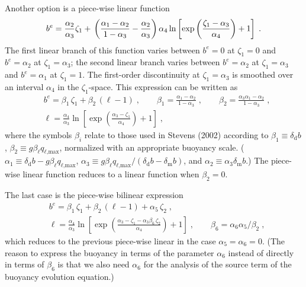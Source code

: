 Another option is a piece-wise linear function
\begin{equation}
b^e=\frac{\alpha_2}{\alpha_3}\zeta_1+\\
\left(\frac{\alpha_1-\alpha_2}{1-\alpha_3}-\frac{\alpha_2}{\alpha_3}\right)
\alpha_4\ln\left[\exp\left(\frac{\zeta_1-\alpha_3}{\alpha_4}\right)+1\right] \;.
\end{equation}
The first linear branch of this function varies between $b^e=0$ at $\zeta_1=0$
and $b^e=\alpha_2$ at $\zeta_1=\alpha_3$; the second linear branch varies
between $b^e=\alpha_2$ at $\zeta_1=\alpha_3$ and $b^e=\alpha_1$ at
$\zeta_1=1$. The first-order discontinuity at $\zeta_1=\alpha_3$ is smoothed
over an interval $\alpha_4$ in the $\zeta_1$-space. This expression can be
written as
\begin{equation}
\begin{aligned}
&b^e=\beta_1\,\zeta_1+\beta_2\,(\ell-1)\;,
\qquad \beta_1=\frac{\alpha_1-\alpha_2}{1-\alpha_3}\;,\qquad
\beta_2=\frac{\alpha_3\alpha_1-\alpha_2}{1-\alpha_3}\;,
\\
&\ell=\frac{\alpha_4}{\alpha_3}\ln\left[\exp\left(\frac{\alpha_3-\zeta_1}{\alpha_4}\right)+1\right] \;,
\end{aligned}
\end{equation}
where the symbols $\beta_i$ relate to those used in Stevens (2002) according to $\beta_1\equiv\delta_\text{d}b$, $\beta_2\equiv g\beta_\ell q_{\ell\text{,max}}$, normalized with an appropriate buoyancy scale. ($\alpha_1\equiv\delta_\text{d}b-g\beta_\ell q_{\ell\text{,max}}$, $\alpha_3\equiv g\beta_\ell q_{\ell\text{,max}}/(\delta_\text{d}b-\delta_\text{m}b)$, and $\alpha_2\equiv\alpha_3\delta_\text{m}b$.) The piece-wise linear function reduces to a linear function when $\beta_2=0$.

The last case is the piece-wise bilinear expression
\begin{equation}
\begin{aligned}
&b^e=\beta_1\,\zeta_1+\beta_2\,(\ell-1) + \alpha_5\,\zeta_2\;,\\
&\ell=\frac{\alpha_4}{\alpha_3}\ln\left[\exp\left(\frac{\alpha_3-\zeta_1-\alpha_3\beta_6\,\zeta_2}{\alpha_4}\right)+1\right]
\;,\qquad \beta_6=\alpha_6\alpha_5/\beta_2\;,
\end{aligned}
\end{equation}
which reduces to the previous piece-wise linear in the case
$\alpha_5=\alpha_6=0$. (The reason to express the buoyancy in terms of the
parameter $\alpha_6$ instead of directly in terms of $\beta_6$ is that we also
need $\alpha_6$ for the analysis of the source term of the buoyancy evolution
equation.)

